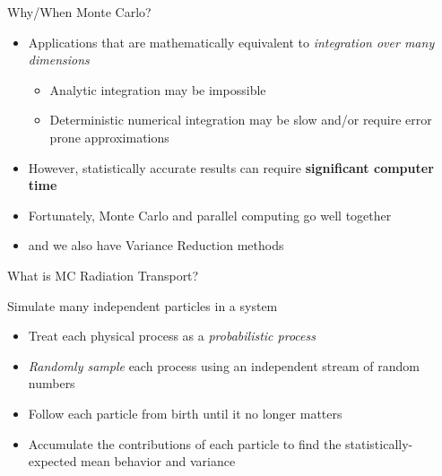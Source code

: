 \documentclass[xcolor=x11names,compress, handout]{beamer}
\renewcommand{\(}{\begin{columns}}
\renewcommand{\)}{\end{columns}}
\newcommand{\<}[1]{\begin{column}{#1}}
\renewcommand{\>}{\end{column}}
\begin{document}
\begin{frame}{Why/When Monte Carlo?}

\begin{itemize}
\item Applications that are mathematically equivalent to \textit{integration over many dimensions}
\vspace*{0.25 em}
\begin{itemize}
\item Analytic integration may be impossible
\vspace*{0.25 em}
\item Deterministic numerical integration may be slow and/or require error prone approximations
\end{itemize} 
\vspace*{0.5 em}
\pause
\item However, statistically accurate results can require \textbf{significant computer time}
\item Fortunately, Monte Carlo and parallel computing go well together
\item and we also have Variance Reduction methods
\end{itemize}

\end{frame}


\begin{frame}{What is MC Radiation Transport?}

Simulate many independent particles in a system
\begin{itemize}
\item Treat each physical process as a
\textit{probabilistic process}
\pause
\item \textit{Randomly sample} each process using an
independent stream of random numbers
\pause
\item Follow each particle from birth until it no
longer matters
\pause
\item Accumulate the contributions of each
particle to find the statistically-expected
mean behavior and variance
\end{itemize}

\end{frame}
\end{document}
